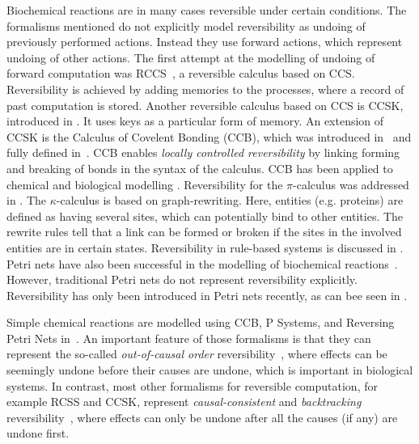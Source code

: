 Biochemical reactions are in many cases reversible under certain conditions. The formalisms mentioned do not explicitly model reversibility as undoing of previously performed actions. Instead they use forward actions, which represent undoing of other actions.
The first attempt at the modelling of undoing of forward computation was RCCS~\cite{10.1007/978-3-540-28644-8_19}, a reversible calculus based on CCS. Reversibility is achieved by adding memories to the processes, where a record of past computation is stored. Another reversible calculus based on CCS is CCSK, introduced in \cite{PHILLIPS200770}. It uses keys as a particular form of memory. An extension of CCSK is the Calculus of Covelent Bonding (CCB), which was introduced in~\cite{KU16} and fully defined in~\cite{KU2017}. CCB enables \textit{locally controlled reversibility} by linking forming and breaking of bonds in the syntax of the calculus. CCB has been applied to chemical and biological modelling \cite{10.1007/978-3-319-99498-7_8, Kuhn2020ReversibilityIC}. Reversibility for the $\pi$-calculus was addressed in \cite{10.1007/978-3-642-15375-4_33}. The $\kappa$-calculus \cite{DANOS200469} is based on graph-rewriting. Here, entities (e.g. proteins) are defined as having several sites, which can potentially bind to other entities. The rewrite rules tell that a link can be formed or broken if the sites in the involved entities are in certain states. Reversibility in rule-based systems is discussed in \cite{Aman2020}. 
Petri nets have also been successful in the modelling of biochemical reactions~\cite{10.1007/978-3-540-68894-5_7}. However, traditional Petri nets do not represent reversibility explicitly. Reversibility has only been introduced in Petri nets recently, as can bee seen in \cite{DBLP:conf/rc/PhilippouP18,DBLP:conf/apn/BarylskaGMPPP18,MelgrattiMU20,MelgrattiMPPU20,DBLP:journals/corr/abs-2010-04000}. 


Simple chemical reactions are modelled using CCB, P Systems, and Reversing Petri Nets in~\cite{Kuhn2020ReversibilityIC}. 
An important feature of those formalisms is that they can represent the so-called \emph{out-of-causal order} reversibility~\cite{Irek2012}, where effects can be seemingly undone before their causes are undone, which is important in biological systems. In contrast, most other formalisms for reversible computation, for example RCSS and CCSK, represent \emph{causal-consistent} and \emph{backtracking} reversibility~\cite{DK2007,LPU2020}, where effects can only be undone after all the causes (if any) are undone first.
